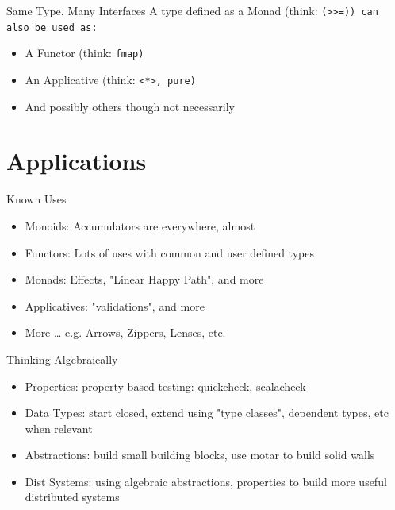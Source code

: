 \documentclass[compress]{beamer}
\begin{document}
\begin{frame}{Same Type, Many Interfaces}
  A type defined as a Monad (think: \tt{(>>=)}) can also be used as:
  \begin{itemize}
    \item \Large{A Functor (think: \tt{fmap})} \newline
    \item \Large{An Applicative (think: \tt{<*>, pure})} \newline
    \item \Large{And possibly others} \small{though not necessarily}
  \end{itemize}
\end{frame}

\section{Applications}

\begin{frame}{Known Uses}
\begin{itemize}
  \item \Large{Monoids:} \small{Accumulators are everywhere, almost} \newline
  \item \Large{Functors:} \small{Lots of uses with common and user defined types} \newline
  \item \Large{Monads:} \small{Effects, "Linear Happy Path", and more} \newline
  \item \Large{Applicatives:} \small{"validations", and more} \newline
  \item \Large{More \ldots} \small{e.g. Arrows, Zippers, Lenses, etc.}
\end{itemize}
\end{frame}

\begin{frame}{Thinking Algebraically}
\begin{itemize}
  \item \Large{Properties:} \small{property based testing: quickcheck, scalacheck} \newline
  \item \Large{Data Types:} \small{start closed, extend using "type classes", dependent types, etc when relevant} \newline
  \item \large{Abstractions:} \small{build small building blocks, use motar to build solid walls} \newline
  \item \large{Dist Systems:} \small{using algebraic abstractions, properties to build more useful distributed systems} \newline
\end{itemize}
\end{frame}
\end{document}
